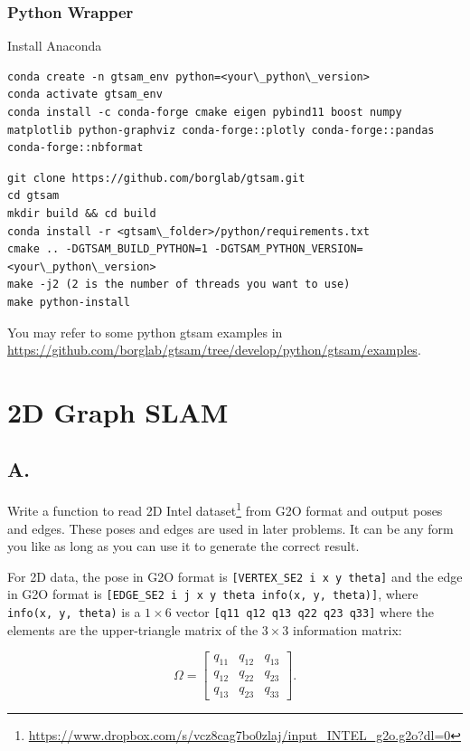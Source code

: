 \documentclass[tp]{lcc}
\begin{document}
\subsubsection{Python Wrapper}

Install Anaconda

\begin{lstlisting}[style=bash] 
conda create -n gtsam_env python=<your\_python\_version>
conda activate gtsam_env
conda install -c conda-forge cmake eigen pybind11 boost numpy matplotlib python-graphviz conda-forge::plotly conda-forge::pandas conda-forge::nbformat
\end{lstlisting}

\begin{lstlisting}[style=bash] 
git clone https://github.com/borglab/gtsam.git
cd gtsam
mkdir build && cd build
conda install -r <gtsam\_folder>/python/requirements.txt
cmake .. -DGTSAM_BUILD_PYTHON=1 -DGTSAM_PYTHON_VERSION=<your\_python\_version>
make -j2 (2 is the number of threads you want to use)
make python-install
\end{lstlisting}

You may refer to some python gtsam examples in \url{https://github.com/borglab/gtsam/tree/develop/python/gtsam/examples}.

\section{2D Graph SLAM}
\subsection{A.}
Write a function to read 2D Intel dataset\footnote{\url{https://www.dropbox.com/s/vcz8cag7bo0zlaj/input_INTEL_g2o.g2o?dl=0}} from G2O format and output poses and edges. These poses and edges are used in later problems. It can be any form you like as long as you can use it to generate the correct result.

For 2D data, the pose in G2O format is \lstinline[style=bash]{[VERTEX_SE2 i x y theta]} and the edge in G2O format is \lstinline[style=bash]{[EDGE_SE2 i j x y theta info(x, y, theta)]}, where \lstinline[style=bash]{info(x, y, theta)} is a $1 \times 6$ vector \lstinline[style=bash]{[q11 q12 q13 q22 q23 q33]} where the elements are the upper-triangle matrix of the $3 \times 3$ information matrix:

\begin{equation*}
    \Omega = \begin{bmatrix} q_{11} & q_{12} & q_{13} \\ q_{12} & q_{22} & q_{23} \\ q_{13} & q_{23} & q_{33} \end{bmatrix}.
\end{equation*}
\end{document}
